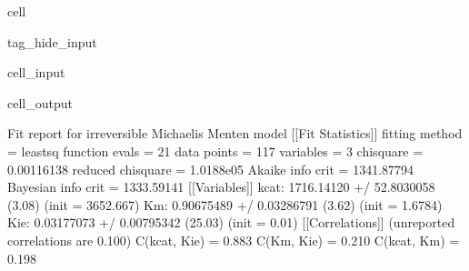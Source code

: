 \documentclass[letterpaper,10pt,english]{jupyterBook}
\begin{document}
\begin{sphinxuseclass}{cell}
\begin{sphinxuseclass}{tag_hide_input}\begin{sphinxVerbatimInput}

\begin{sphinxuseclass}{cell_input}
\begin{sphinxVerbatim}[commandchars=\\\{\}]
 
\end{sphinxVerbatim}

\end{sphinxuseclass}\end{sphinxVerbatimInput}
\begin{sphinxVerbatimOutput}

\begin{sphinxuseclass}{cell_output}
\begin{sphinxVerbatim}[commandchars=\\\{\}]
Fit report for irreversible Michaelis Menten model
[[Fit Statistics]]
    \PYGZsh{} fitting method   = leastsq
    \PYGZsh{} function evals   = 21
    \PYGZsh{} data points      = 117
    \PYGZsh{} variables        = 3
    chi\PYGZhy{}square         = 0.00116138
    reduced chi\PYGZhy{}square = 1.0188e\PYGZhy{}05
    Akaike info crit   = \PYGZhy{}1341.87794
    Bayesian info crit = \PYGZhy{}1333.59141
[[Variables]]
    k\PYGZus{}cat:  1716.14120 +/\PYGZhy{} 52.8030058 (3.08\PYGZpc{}) (init = 3652.667)
    Km:     0.90675489 +/\PYGZhy{} 0.03286791 (3.62\PYGZpc{}) (init = 1.6784)
    K\PYGZus{}ie:   0.03177073 +/\PYGZhy{} 0.00795342 (25.03\PYGZpc{}) (init = 0.01)
[[Correlations]] (unreported correlations are \PYGZlt{} 0.100)
    C(k\PYGZus{}cat, K\PYGZus{}ie) = 0.883
    C(Km, K\PYGZus{}ie)    = \PYGZhy{}0.210
    C(k\PYGZus{}cat, Km)   = 0.198
\end{sphinxVerbatim}

\noindent{}

\end{sphinxuseclass}\end{sphinxVerbatimOutput}

\end{sphinxuseclass}
\end{sphinxuseclass}
\sphinxstepscope
\end{document}

